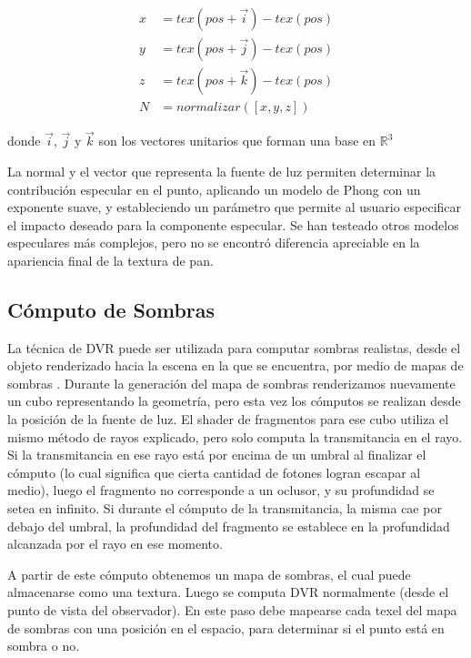 \begin{equation}
\begin{aligned}
x &= tex(pos+\vec{i}) - tex(pos)\\
y &= tex(pos+\vec{j}) - tex(pos)\\
z &= tex(pos+\vec{k}) - tex(pos) \\
N &= normalizar([x,y,z])
\end{aligned}
\end{equation}

\noindent donde $\vec{i}$, $\vec{j}$ y $\vec{k}$ son los vectores unitarios que forman una base en $\mathbb{R}^{3}$

La normal y el vector que representa la fuente de luz permiten determinar la contribución especular en el punto, aplicando un modelo de Phong con un exponente suave, y estableciendo un parámetro que permite al usuario especificar el impacto deseado para la componente especular.
Se han testeado otros modelos especulares más complejos, pero no se encontró diferencia apreciable en la apariencia final de la textura de pan.

\subsection{Cómputo de Sombras}
La técnica de DVR puede ser utilizada para computar sombras realistas, desde el objeto renderizado hacia la escena en la que se encuentra, por medio de mapas de sombras \cite{Williams1978}.
Durante la generación del mapa de sombras renderizamos nuevamente un cubo representando la geometría, pero esta vez los cómputos se realizan desde la posición de la fuente de luz.
El shader de fragmentos para ese cubo utiliza el mismo método de rayos explicado, pero solo computa la transmitancia en el rayo.
Si la transmitancia en ese rayo está por encima de un umbral al finalizar el cómputo (lo cual significa que cierta cantidad de fotones logran escapar al medio), luego el fragmento no corresponde a un oclusor, y su profundidad se setea en infinito.
Si durante el cómputo de la transmitancia, la misma cae por debajo del umbral, la profundidad del fragmento se establece en la profundidad alcanzada por el rayo en ese momento.

A partir de este cómputo obtenemos un mapa de sombras, el cual puede almacenarse como una textura.
Luego se computa DVR normalmente (desde el punto de vista del observador).
En este paso debe mapearse cada texel del mapa de sombras con una posición en el espacio, para determinar si el punto está en sombra o no.

